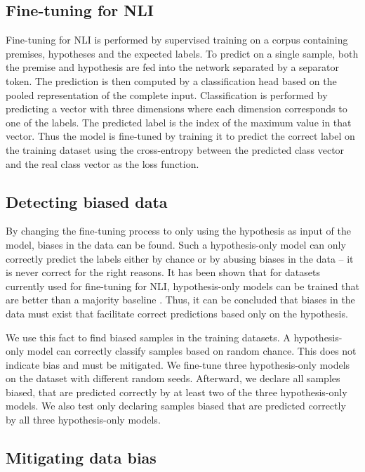 \subsection{Fine-tuning for \acs{NLI}}

Fine-tuning for \acs{NLI} is performed by supervised training on a corpus containing premises, hypotheses and the expected labels. To predict on a single sample, both the premise and hypothesis are fed into the network separated by a separator token. The prediction is then computed by a classification head based on the pooled representation of the complete input. Classification is performed by predicting a vector with three dimensions where each dimension corresponds to one of the labels. The predicted label is the index of the maximum value in that vector. Thus the model is fine-tuned by training it to predict the correct label on the training dataset using the cross-entropy between the predicted class vector and the real class vector as the loss function.

\subsection{Detecting biased data}

By changing the fine-tuning process to only using the hypothesis as input of the model, biases in the data can be found. Such a hypothesis-only model can only correctly predict the labels either by chance or by abusing biases in the data -- it is never correct for the right reasons. It has been shown that for datasets currently used for fine-tuning for \acs{NLI}, hypothesis-only models can be trained that are better than a majority baseline \citep{hyponly}. Thus, it can be concluded that biases in the data must exist that facilitate correct predictions based only on the hypothesis.

We use this fact to find biased samples in the training datasets. A hypothesis-only model can correctly classify samples based on random chance. This does not indicate bias and must be mitigated. We fine-tune three hypothesis-only models on the dataset with different random seeds. Afterward, we declare all samples biased, that are predicted correctly by at least two of the three hypothesis-only models. We also test only declaring samples biased that are predicted correctly by all three hypothesis-only models.


\subsection{Mitigating data bias}\label{par:method:mitigating_data_bias}

